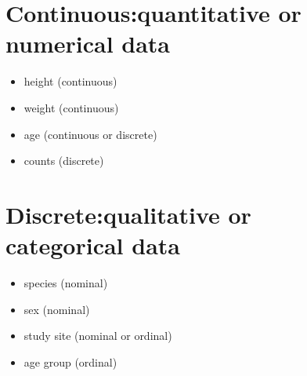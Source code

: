 \documentclass[
  letterpaper,
  DIV=11,
  numbers=noendperiod,
  oneside]{scrreprt}
\providecommand{\tightlist}{%
  \setlength{\itemsep}{0pt}\setlength{\parskip}{0pt}}\usepackage{longtable,booktabs,array}
\begin{document}
\begin{figure}

\begin{minipage}[t]{0.50\linewidth}

{\centering 

\hypertarget{continuous-quantitative-or-numerical-data-1}{%
\section{\texorpdfstring{Continuous:quantitative or numerical
data}{Continuous: quantitative or numerical data}}\label{continuous-quantitative-or-numerical-data-1}}

\begin{itemize}
\tightlist
\item
  height (continuous)
\item
  weight (continuous)
\item
  age (continuous or discrete)
\item
  counts (discrete)
\end{itemize}

}

\end{minipage}%
%
\begin{minipage}[t]{0.50\linewidth}

{\centering 

\hypertarget{discrete-qualitative-or-categorical-data-1}{%
\section{\texorpdfstring{Discrete:qualitative or categorical
data}{Discrete: qualitative or categorical data}}\label{discrete-qualitative-or-categorical-data-1}}

\begin{itemize}
\tightlist
\item
  species (nominal)
\item
  sex (nominal)
\item
  study site (nominal or ordinal)
\item
  age group (ordinal)
\end{itemize}

}

\end{minipage}%

\end{figure}
\end{document}

